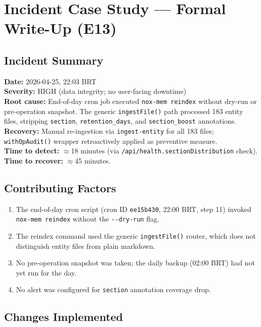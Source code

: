 \documentclass{article}
\begin{document}
\section{Incident Case Study --- Formal Write-Up (E13)}

\subsection{Incident Summary}

\textbf{Date:} 2026-04-25, 22:03 BRT \\
\textbf{Severity:} HIGH (data integrity; no user-facing downtime) \\
\textbf{Root cause:} End-of-day cron job executed \texttt{nox-mem reindex} without
dry-run or pre-operation snapshot. The generic \texttt{ingestFile()} path processed 183
entity files, stripping \texttt{section}, \texttt{retention\_days}, and
\texttt{section\_boost} annotations. \\
\textbf{Recovery:} Manual re-ingestion via \texttt{ingest-entity} for all 183 files;
\texttt{withOpAudit()} wrapper retroactively applied as preventive measure. \\
\textbf{Time to detect:} $\approx$18 minutes (via \texttt{/api/health.sectionDistribution}
check). \\
\textbf{Time to recover:} $\approx$45 minutes.

\subsection{Contributing Factors}

\begin{enumerate}
  \item The end-of-day cron script (cron ID \texttt{ee15b430}, 22:00 BRT, step 11)
    invoked \texttt{nox-mem reindex} without the \texttt{-{}-dry-run} flag.
  \item The reindex command used the generic \texttt{ingestFile()} router, which does not
    distinguish entity files from plain markdown.
  \item No pre-operation snapshot was taken; the daily backup (02:00 BRT) had not yet run
    for the day.
  \item No alert was configured for \texttt{section} annotation coverage drop.
\end{enumerate}

\subsection{Changes Implemented}
\end{document}
